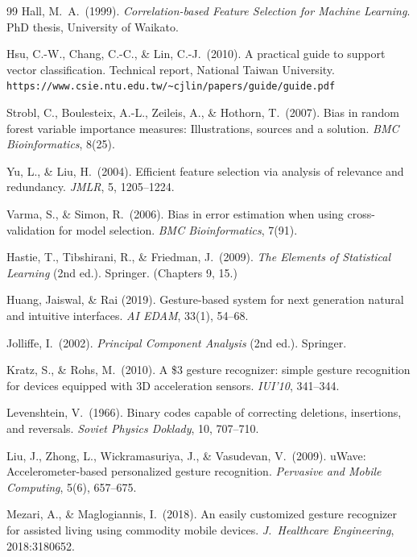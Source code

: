 \documentclass[11pt,a4paper]{article}
\begin{document}
\begin{thebibliography}{99}
Hall, M.~A.\ (1999). \textit{Correlation-based Feature Selection for
Machine Learning}. PhD thesis, University of Waikato.

Hsu, C.-W., Chang, C.-C., \& Lin, C.-J.\ (2010). A practical guide to
support vector classification. Technical report, National Taiwan
University. \texttt{https://www.csie.ntu.edu.tw/{\textasciitilde}cjlin/papers/guide/guide.pdf}

Strobl, C., Boulesteix, A.-L., Zeileis, A., \& Hothorn, T.\ (2007).
Bias in random forest variable importance measures: Illustrations,
sources and a solution. \textit{BMC Bioinformatics}, 8(25).

Yu, L., \& Liu, H.\ (2004). Efficient feature selection via analysis of
relevance and redundancy. \textit{JMLR}, 5, 1205--1224.

Varma, S., \& Simon, R.\ (2006). Bias in error estimation when using
cross-validation for model selection.
\textit{BMC Bioinformatics}, 7(91).

Hastie, T., Tibshirani, R., \& Friedman, J.\ (2009).
\textit{The Elements of Statistical Learning} (2nd ed.). Springer.
(Chapters 9, 15.)

Huang, Jaiswal, \& Rai (2019). Gesture-based system for next
generation natural and intuitive interfaces.
\textit{AI EDAM}, 33(1), 54--68.

Jolliffe, I.\ (2002). \textit{Principal Component Analysis}
(2nd ed.). Springer.

Kratz, S., \& Rohs, M.\ (2010). A \$3 gesture recognizer: simple
gesture recognition for devices equipped with 3D acceleration
sensors. \textit{IUI'10}, 341--344.

Levenshtein, V.\ (1966). Binary codes capable of correcting deletions,
insertions, and reversals. \textit{Soviet Physics Doklady},
10, 707--710.

Liu, J., Zhong, L., Wickramasuriya, J., \& Vasudevan, V.\ (2009).
uWave: Accelerometer-based personalized gesture recognition.
\textit{Pervasive and Mobile Computing}, 5(6), 657--675.

Mezari, A., \& Maglogiannis, I.\ (2018). An easily customized gesture
recognizer for assisted living using commodity mobile devices.
\textit{J.\ Healthcare Engineering}, 2018:3180652.


\end{thebibliography}
\end{document}
